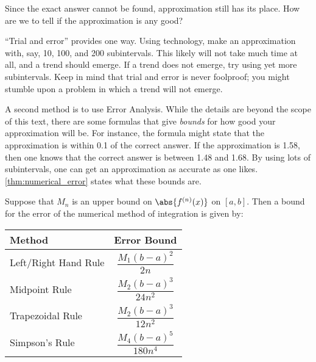 Since the exact answer cannot be found, approximation still has its place. How are we to tell if the approximation is any good?

``Trial and error'' provides one way. %
Using technology, make an approximation with, say, 10, 100, and 200 subintervals. This likely will not take much time at all, and a trend should emerge. If a trend does not emerge, try using yet more subintervals. Keep in mind that trial and error is never foolproof; you might stumble upon a problem in which a trend will not emerge.

A second method is to use Error Analysis. While the details are beyond the scope of this text, there are some formulas that give \textit{bounds} for how good your approximation will be. For instance, the formula might state that the approximation is within 0.1 of the correct answer. If the approximation is 1.58, then one knows that the correct answer is between 1.48 and 1.68. By using lots of subintervals, one can get an approximation as accurate as one likes. \autoref{thm:numerical_error} states what these bounds are.

%
{Suppose that $M_n$ is an upper bound on $\abs{f^{(n)}(x)}$ on $[a,b]$.  Then a bound for the error of the numerical method of integration is given by:
\begin{center}
\begin{tabular}{lc}
Method & Error Bound \\\midrule
Left/Right Hand Rule & $\dfrac{M_1(b-a)^2}{2n}$ \\
Midpoint Rule & $\dfrac{M_2(b-a)^3}{24n^2}$ \\
Trapezoidal Rule & $\dfrac{M_2(b-a)^3}{12n^2}$ \\
Simpson's Rule & $\dfrac{M_4(b-a)^5}{180n^4}$
\end{tabular}
\end{center}}


